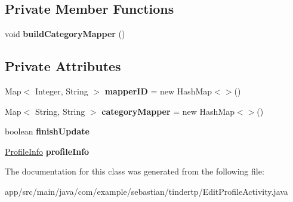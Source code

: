 \subsection*{Private Member Functions}
\begin{DoxyCompactItemize}
\item 
void {\bfseries build\+Category\+Mapper} ()\hypertarget{classcom_1_1example_1_1sebastian_1_1tindertp_1_1EditProfileActivity_a856487af26884b980f8c5409c52cd890}{}\label{classcom_1_1example_1_1sebastian_1_1tindertp_1_1EditProfileActivity_a856487af26884b980f8c5409c52cd890}

\end{DoxyCompactItemize}
\subsection*{Private Attributes}
\begin{DoxyCompactItemize}
\item 
Map$<$ Integer, String $>$ {\bfseries mapper\+ID} = new Hash\+Map$<$$>$()\hypertarget{classcom_1_1example_1_1sebastian_1_1tindertp_1_1EditProfileActivity_a188cc80e1bb37a04cdcf81ccc0eab7e5}{}\label{classcom_1_1example_1_1sebastian_1_1tindertp_1_1EditProfileActivity_a188cc80e1bb37a04cdcf81ccc0eab7e5}

\item 
Map$<$ String, String $>$ {\bfseries category\+Mapper} = new Hash\+Map$<$$>$()\hypertarget{classcom_1_1example_1_1sebastian_1_1tindertp_1_1EditProfileActivity_a2d67b2eb88b506597e034d1ba7d939a0}{}\label{classcom_1_1example_1_1sebastian_1_1tindertp_1_1EditProfileActivity_a2d67b2eb88b506597e034d1ba7d939a0}

\item 
boolean {\bfseries finish\+Update}\hypertarget{classcom_1_1example_1_1sebastian_1_1tindertp_1_1EditProfileActivity_aaf2ef6f21f2e91f38537b44d4742b3c0}{}\label{classcom_1_1example_1_1sebastian_1_1tindertp_1_1EditProfileActivity_aaf2ef6f21f2e91f38537b44d4742b3c0}

\item 
\hyperlink{classcom_1_1example_1_1sebastian_1_1tindertp_1_1commonTools_1_1ProfileInfo}{Profile\+Info} {\bfseries profile\+Info}\hypertarget{classcom_1_1example_1_1sebastian_1_1tindertp_1_1EditProfileActivity_a8936a190d1f180c7da5ee55fd736adf1}{}\label{classcom_1_1example_1_1sebastian_1_1tindertp_1_1EditProfileActivity_a8936a190d1f180c7da5ee55fd736adf1}

\end{DoxyCompactItemize}


The documentation for this class was generated from the following file\+:\begin{DoxyCompactItemize}
\item 
app/src/main/java/com/example/sebastian/tindertp/Edit\+Profile\+Activity.\+java\end{DoxyCompactItemize}
